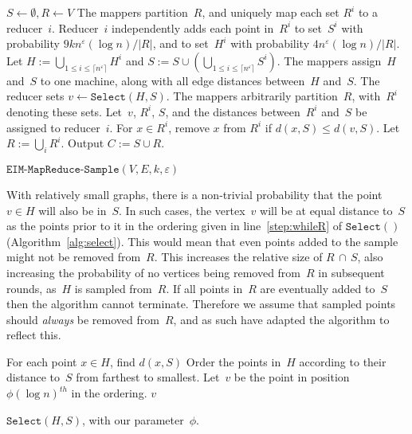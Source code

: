 \documentclass[11pt]{article}
\newcommand{\eps}{\ensuremath{\varepsilon}}
\begin{document}
{
\begin{algorithm}\begin{algorithmic}[1]
\small
\STATE $S\gets \emptyset, R\gets V$
\WHILE{$|R|>(4/\eps)kn^{\eps}\log n$}
		\STATE The mappers partition~$R$, and uniquely map each set $R^i$ to a reducer~$i$.
		\STATE Reducer~$i$ independently adds each point in~$R^i$ to set~$S^i$  with probability $9kn^{\eps}(\log n)/|R|$, and to set~$H^i$  with probability $4n^{\eps}(\log n)/|R|$.
		\STATE Let $H:=\bigcup_{1\leq i\leq\lceil n^{\eps}\rceil}H^i$ and $S:=S\cup(\bigcup_{1\leq i\leq\lceil n^{\eps}\rceil}S^i)$. The mappers
assign~$H$ and~$S$ to one machine, along with all edge distances between~$H$ and~$S$.
		\STATE The reducer sets $v\gets \texttt{Select}(H,S)$.
		\STATE The mappers arbitrarily partition~$R$, with~$R^i$ denoting  these sets. Let~$v$, $R^i$, $S$, and the distances between~$R^i$ and~$S$ be assigned to reducer~$i$. 
		\STATE For $x\in R^i$, remove $x$ from $R^i$ if $d(x,S)\leq d(v,S)$.\label{step:keepx}	 	
		\STATE Let $R:=\bigcup_{i}R^i$.
\ENDWHILE
\STATE Output $C:=S\cup	R$.
\end{algorithmic}
\caption{$\texttt{EIM-MapReduce-Sample}(V,E,k,\eps)$}
\label{alg:EIM-MRS}
\end{algorithm}
}



With relatively small graphs, there is
a non-trivial probability that the point~$v\in H$ will also be in~$S$.
In such cases, the vertex~$v$ will be at equal distance to~$S$ as the
points prior to it in the ordering given in line~\ref{step:whileR}
of $\texttt{Select}()$ (Algorithm~\ref{alg:select}).
This would mean that even points added to the sample might not be removed from~$R$.  
This increases the relative size of $R\, \cap\, S$, also increasing
the probability of no vertices being removed from~$R$ in subsequent rounds,
as~$H$ is sampled from~$R$.
If all points in~$R$ are eventually added to~$S$ then the algorithm cannot
terminate.
Therefore we assume that sampled points should \emph{always} be removed
from~$R$, and as such have adapted the algorithm to reflect this.

\begin{algorithm}[H]
\begin{algorithmic}[1]
\small
\STATE For each point $x\in H$, find $d(x,S)$
\STATE \label{step:whileR} Order the points in~$H$ according to their distance to~$S$ from farthest to smallest.
\STATE Let~$v$ be the point in position $\phi(\log n)^{th}$  in the ordering.
\RETURN $v$
\end{algorithmic}
\caption{$\texttt{Select}(H,S)$, with our parameter~$\phi$.}
\label{alg:select}
\end{algorithm}
\end{document}
